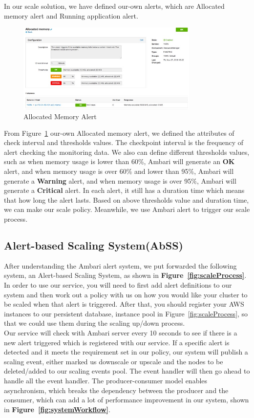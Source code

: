 \documentclass{article}
\begin{document}
In our scale solution, we have defined our-own alerts, which are Allocated memory alert and Running application alert. 
\begin{figure}[ht!]
\centering
\includegraphics[width=0.8\textwidth,natwidth=1000,natheight=800]{AllocatedMemoryAlert.png}
\caption{Allocated Memory Alert}
\label{fig:AllocatedMemoryAlert}
\end{figure}
From Figure~\ref{fig:AllocatedMemoryAlert} our-own Allocated memory alert, we defined the attributes of check interval and thresholds values. The checkpoint interval is the frequency of alert checking the monitoring data. We also can define different thresholds values, such as when memory usage is lower than 60\%, Ambari will generate an \textbf{OK} alert, and when memory usage is over 60\% and lower than 95\%, Ambari will generate a \textbf{Warning} alert, and when memory usage is over 95\%, Ambari will generate a \textbf{Critical} alert. In each alert, it still has a duration time which means that how long the alert lasts. Based on above thresholds value and duration time, we can make our scale policy. Meanwhile, we use Ambari alert to trigger our scale process. 

\subsection{Alert-based Scaling System(AbSS)}
After understanding the Ambari alert system, we put forwarded the following system, an Alert-based Scaling System, as shown in \textbf{Figure~\ref{fig:scaleProcess}}. In order to use our service, you will need to first add alert definitions to our system and then work out a policy with us on how you would like your cluster to be scaled when that alert is triggered. After that, you should register your AWS instances to our persistent database, instance pool in Figure~\ref{fig:scaleProcess}, so that we could use them during the scaling up/down process.\\
Our service will check with Ambari server every 10 seconds to see if there is a new alert triggered which is registered with our service. If a specific alert is detected and it meets the requirement set in our policy, our system will publish a scaling event, either marked us downscale or upscale and the nodes to be deleted/added to our scaling events pool. The event handler will then go ahead to handle all the event handler. The producer-consumer model enables asynchronism, which breaks the dependency between the producer and the consumer, which can add a lot of performance improvement in our system, shown in \textbf{Figure~\ref{fig:systemWorkflow}}.
\end{document}
